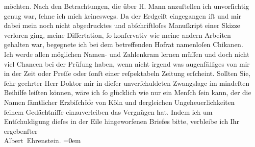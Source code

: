 \begin{ledgroupsized}[t]{13cm}
               möchten. Nach den Betrachtungen, die über H.
                  Mann anzuſtellen ich unvorſichtig genug war, ſehne ich mich keineswegs. Da
                  {\pb}der Erdgeiſt eingegangen iſt und mir dabei mein noch nicht abgedrucktes und
               abſchriftloſes Manuſkript einer Skizze verloren ging, meine Diſſertation, ſo konſervativ wie meine
               andern Arbeiten gehalten war, begegnete ich bei dem betreffenden Hofrat namenloſen Chikanen. Ich werde allen
               möglichen Namen- und Zahlenkram lernen müſſen und doch nicht viel Chancen bei der
               Prüfung haben, wenn nicht irgend was augenfälliges von mir in der Zeit oder Preſſe oder ſonſt
               einer reſpektabeln Zeitung erſcheint. Sollten Sie, {\pb}ſehr geehrter Herr Doktor mir in dieſer
               unverſchuldeten Zwangslage im mindeſten Beihilfe leiſten können, wäre ich ſo
               glücklich wie nur ein Menſch ſein kann, der die Namen ſämtlicher Erzbiſchöfe von Köln und dergleichen Ungeheuerlichkeiten ſeinem
               Gedächtniſſe einzuverleiben das Vergnügen hat.\pend
           \pstart
           Indem ich um Entſchuldigung dieſes in der Eile hingeworfenen Briefes bitte, verbleibe
               ich\pend
           \pstart
           Ihr ergebenſter{\\[\baselineskip]}\spacefill\mbox{Albert Ehrenstein.}\pend
           \leftskip=0em{}
         
         \endnumbering{}\end{ledgroupsized}  \newcommand{\dateiname}{L01852}\newcommand{\titel}{Albert Ehrenstein an Arthur Schnitzler, 1. 7. 1909}\newcommand{\editorInnen}{Martin Anton Müller und Gerd-Hermann Susen}
      